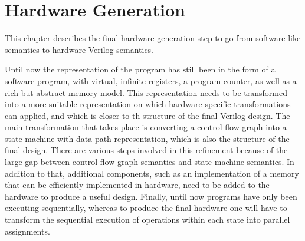 \chapter{Hardware Generation}%
\label{sec:hardware-generation}

\begin{chapsummary}
  This chapter describes the final hardware generation step to go from
  software-like semantics to hardware Verilog semantics.
\end{chapsummary}

\noindent Until now the representation of the program has still been in the form
of a software program, with virtual, infinite registers, a program counter, as
well as a rich but abstract memory model.  This representation needs to be
transformed into a more suitable representation on which hardware specific
transformations can applied, and which is closer to th structure of the final
Verilog design.  The main transformation that takes place is converting a
control-flow graph into a state machine with data-path representation, which is
also the structure of the final design.  There are various steps involved in
this refinement because of the large gap between control-flow graph semantics
and state machine semantics.  In addition to that, additional components, such
as an implementation of a memory that can be efficiently implemented in
hardware, need to be added to the hardware to produce a useful design.  Finally,
until now programs have only been executing sequentially, whereas to produce the
final hardware one will have to transform the sequential execution of operations
within each state into parallel assignments.

